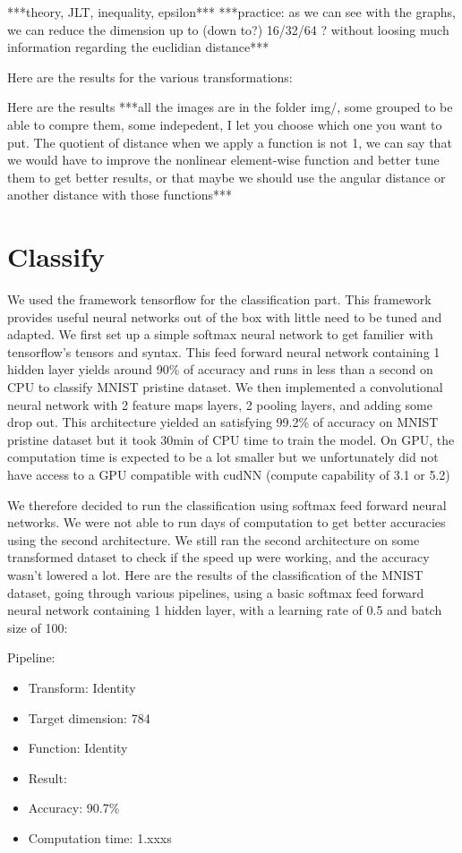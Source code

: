 \documentclass[11pt,a4paper]{article}
\begin{document}
	***theory, JLT, inequality, epsilon***
	***practice: as we can see with the graphs, we can reduce the dimension up to (down to?) 16/32/64 ? without loosing much information regarding the euclidian distance***
	
	Here are the results for the various transformations:
	
	
	Here are the results
	***all the images are in the folder img/, some grouped to be able to compre them, some indepedent, I let you choose which one you want to put. The quotient of distance when we apply a function is not 1, we can say that we would have to improve the nonlinear element-wise function and better tune them to get better results, or that maybe we should use the angular distance or another distance with those functions***
	
	\section{Classify}
	We used the framework tensorflow for the classification part. This framework provides useful neural networks out of the box with little need to be tuned and adapted. We first set up a simple softmax neural network to get familier with tensorflow's tensors and syntax. This feed forward neural network containing 1 hidden layer yields around 90\% of accuracy and runs in less than a second on CPU to classify MNIST pristine dataset.
	We then implemented a convolutional neural network with 2 feature maps layers, 2 pooling layers, and adding some drop out. This architecture yielded an satisfying 99.2\% of accuracy on MNIST pristine dataset but it took 30min of CPU time to train the model. On GPU, the computation time is expected to be a lot smaller but we unfortunately did not have access to a GPU compatible with cudNN (compute capability of 3.1 or 5.2)
	
	We therefore decided to run the classification using softmax feed forward neural networks. We were not able to run days of computation to get better accuracies using the second architecture. We still ran the second architecture on some transformed dataset to check if the speed up were working, and the accuracy wasn't lowered a lot. 
	Here are the results of the classification of the MNIST dataset, going through various pipelines, using a basic softmax feed forward neural network containing 1 hidden layer, with a learning rate of 0.5 and batch size of 100:
	
	Pipeline:
	\begin{itemize}
			\item Transform: Identity
			\item Target dimension: 784
			\item Function: Identity
			\item Result:
			\item Accuracy: 90.7\%
			\item Computation time: 1.xxxs
	\end{itemize}
\end{document}
